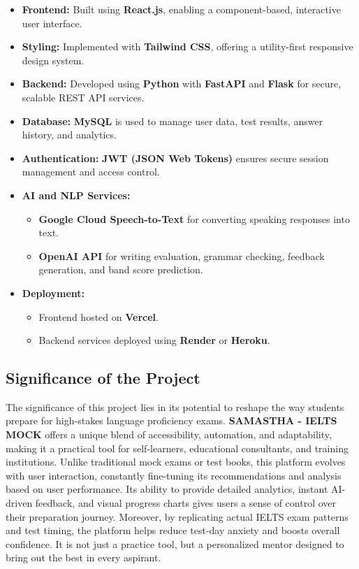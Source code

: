\documentclass[a4paper,12pt]{article}
\begin{document}
\begin{itemize}
    \item \textbf{Frontend:} Built using \textbf{React.js}, enabling a component-based, interactive user interface.
    \item \textbf{Styling:} Implemented with \textbf{Tailwind CSS}, offering a utility-first responsive design system.
    \item \textbf{Backend:} Developed using \textbf{Python} with \textbf{FastAPI} and \textbf{Flask} for secure, scalable REST API services.
    \item \textbf{Database:} \textbf{MySQL} is used to manage user data, test results, answer history, and analytics.
    \item \textbf{Authentication:} \textbf{JWT (JSON Web Tokens)} ensures secure session management and access control.
    \item \textbf{AI and NLP Services:}
    \begin{itemize}
        \item \textbf{Google Cloud Speech-to-Text} for converting speaking responses into text.
        \item \textbf{OpenAI API} for writing evaluation, grammar checking, feedback generation, and band score prediction.
    \end{itemize}
    \item \textbf{Deployment:} 
    \begin{itemize}
        \item Frontend hosted on \textbf{Vercel}.
        \item Backend services deployed using \textbf{Render} or \textbf{Heroku}.
    \end{itemize}
\end{itemize}


\vspace{0.5cm}

\subsection{Significance of the Project}

The significance of this project lies in its potential to reshape the way students prepare for high-stakes language proficiency exams. \textbf{SAMASTHA - IELTS MOCK} offers a unique blend of accessibility, automation, and adaptability, making it a practical tool for self-learners, educational consultants, and training institutions. Unlike traditional mock exams or test books, this platform evolves with user interaction, constantly fine-tuning its recommendations and analysis based on user performance. Its ability to provide detailed analytics, instant AI-driven feedback, and visual progress charts gives users a sense of control over their preparation journey. Moreover, by replicating actual IELTS exam patterns and test timing, the platform helps reduce test-day anxiety and boosts overall confidence. It is not just a practice tool, but a personalized mentor designed to bring out the best in every aspirant.
\end{document}
